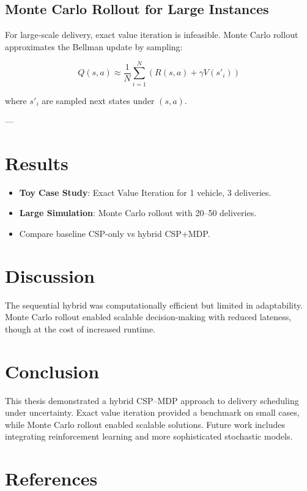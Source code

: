 \documentclass[a4paper,12pt]{report}
\begin{document}
\section{Monte Carlo Rollout for Large Instances}
For large-scale delivery, exact value iteration is infeasible.
Monte Carlo rollout approximates the Bellman update by sampling:

\[
Q(s,a) \approx \frac{1}{N} \sum_{i=1}^N 
\left( R(s,a) + \gamma V(s'_i) \right)
\]

where $s'_i$ are sampled next states under $(s,a)$.

---

\chapter{Results}
\begin{itemize}
    \item \textbf{Toy Case Study}: Exact Value Iteration for 1 vehicle, 3 deliveries.
    \item \textbf{Large Simulation}: Monte Carlo rollout with 20--50 deliveries.
    \item Compare baseline CSP-only vs hybrid CSP+MDP.
\end{itemize}

\chapter{Discussion}
The sequential hybrid was computationally efficient but limited in adaptability.
Monte Carlo rollout enabled scalable decision-making with reduced lateness, 
though at the cost of increased runtime.

\chapter{Conclusion}
This thesis demonstrated a hybrid CSP--MDP approach to delivery scheduling under uncertainty. 
Exact value iteration provided a benchmark on small cases, while Monte Carlo rollout enabled 
scalable solutions. Future work includes integrating reinforcement learning and more 
sophisticated stochastic models.

\chapter*{References}


\end{document}
